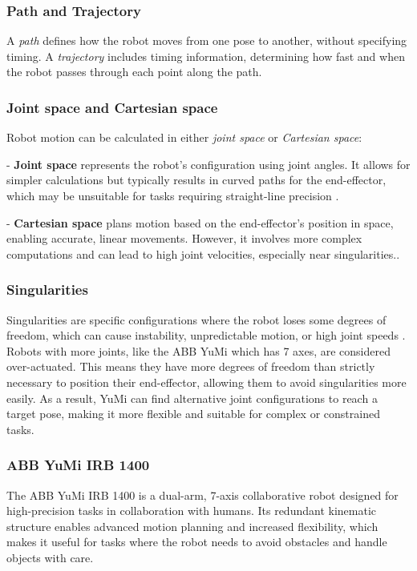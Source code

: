 \documentclass[a4paper,12pt]{article}
\begin{document}
\subsubsection{Path and Trajectory}
A \textit{path} defines how the robot moves from one pose to another, without specifying timing. A \textit{trajectory} includes timing information, determining how fast and when the robot passes through each point along the path.

\subsubsection{Joint space and Cartesian space}
Robot motion can be calculated in either \textit{joint space} or \textit{Cartesian space}:

- \textbf{Joint space} represents the robot's configuration using joint angles. It allows for simpler calculations but typically results in curved paths for the end-effector, which may be unsuitable for tasks requiring straight-line precision \parencite{corke2017}.

- \textbf{Cartesian space} plans motion based on the end-effector's position in space, enabling accurate, linear movements. However, it involves more complex computations and can lead to high joint velocities, especially near singularities.\parencite{corke2017}.

\subsubsection{Singularities}
Singularities are specific configurations where the robot loses some degrees of freedom, which can cause instability, unpredictable motion, or high joint speeds \parencite{corke2017}. Robots with more joints, like the ABB YuMi which has 7 axes, are considered over-actuated. This means they have more degrees of freedom than strictly necessary to position their end-effector, allowing them to avoid singularities more easily. As a result, YuMi can find alternative joint configurations to reach a target pose, making it more flexible and suitable for complex or constrained tasks.

\subsubsection{ABB YuMi IRB 1400}
The ABB YuMi IRB 1400 is a dual-arm, 7-axis collaborative robot designed for high-precision tasks in collaboration with humans. Its redundant kinematic structure enables advanced motion planning and increased flexibility, which makes it useful for tasks where the robot needs to avoid obstacles and handle objects with care.
\end{document}
